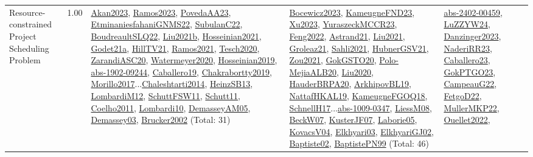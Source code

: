 {\begin{longtable}{p{3cm}r>{\raggedright\arraybackslash}p{6cm}>{\raggedright\arraybackslash}p{6cm}>{\raggedright\arraybackslash}p{8cm}}
\index{Resource-constrained Project Scheduling Problem}\index{Classification!Resource-constrained Project Scheduling Problem}Resource-constrained Project Scheduling Problem &  1.00 & \hyperref[detail:Akan2023]{Akan2023}, \hyperref[detail:Ramos2023]{Ramos2023}, \hyperref[detail:PovedaAA23]{PovedaAA23}, \hyperref[detail:EtminaniesfahaniGNMS22]{EtminaniesfahaniGNMS22}, \hyperref[detail:SubulanC22]{SubulanC22}, \hyperref[detail:BoudreaultSLQ22]{BoudreaultSLQ22}, \hyperref[detail:Liu2021b]{Liu2021b}, \hyperref[detail:Hosseinian2021]{Hosseinian2021}, \hyperref[detail:Godet21a]{Godet21a}, \hyperref[detail:HillTV21]{HillTV21}, \hyperref[detail:Ramos2021]{Ramos2021}, \hyperref[detail:Tesch2020]{Tesch2020}, \hyperref[detail:ZarandiASC20]{ZarandiASC20}, \hyperref[detail:Watermeyer2020]{Watermeyer2020}, \hyperref[detail:Hosseinian2019]{Hosseinian2019}, \hyperref[detail:abs-1902-09244]{abs-1902-09244}, \hyperref[detail:Caballero19]{Caballero19}, \hyperref[detail:Chakrabortty2019]{Chakrabortty2019}, \hyperref[detail:Morillo2017]{Morillo2017}...\hyperref[detail:Chaleshtarti2014]{Chaleshtarti2014}, \hyperref[detail:HeinzSB13]{HeinzSB13}, \hyperref[detail:LombardiM12]{LombardiM12}, \hyperref[detail:SchuttFSW11]{SchuttFSW11}, \hyperref[detail:Schutt11]{Schutt11}, \hyperref[detail:Coelho2011]{Coelho2011}, \hyperref[detail:Lombardi10]{Lombardi10}, \hyperref[detail:DemasseyAM05]{DemasseyAM05}, \hyperref[detail:Demassey03]{Demassey03}, \hyperref[detail:Brucker2002]{Brucker2002} (Total: 31) & \hyperref[detail:Bocewicz2023]{Bocewicz2023}, \hyperref[detail:KameugneFND23]{KameugneFND23}, \hyperref[detail:Xu2023]{Xu2023}, \hyperref[detail:YuraszeckMCCR23]{YuraszeckMCCR23}, \hyperref[detail:Feng2022]{Feng2022}, \hyperref[detail:Astrand21]{Astrand21}, \hyperref[detail:Liu2021]{Liu2021}, \hyperref[detail:Groleaz21]{Groleaz21}, \hyperref[detail:Sahli2021]{Sahli2021}, \hyperref[detail:HubnerGSV21]{HubnerGSV21}, \hyperref[detail:Zou2021]{Zou2021}, \hyperref[detail:GokGSTO20]{GokGSTO20}, \hyperref[detail:Polo-MejiaALB20]{Polo-MejiaALB20}, \hyperref[detail:Liu2020]{Liu2020}, \hyperref[detail:HauderBRPA20]{HauderBRPA20}, \hyperref[detail:ArkhipovBL19]{ArkhipovBL19}, \hyperref[detail:NattafHKAL19]{NattafHKAL19}, \hyperref[detail:KameugneFGOQ18]{KameugneFGOQ18}, \hyperref[detail:SchnellH17]{SchnellH17}...\hyperref[detail:abs-1009-0347]{abs-1009-0347}, \hyperref[detail:LiessM08]{LiessM08}, \hyperref[detail:BeckW07]{BeckW07}, \hyperref[detail:KusterJF07]{KusterJF07}, \hyperref[detail:Laborie05]{Laborie05}, \hyperref[detail:KovacsV04]{KovacsV04}, \hyperref[detail:Elkhyari03]{Elkhyari03}, \hyperref[detail:ElkhyariGJ02]{ElkhyariGJ02}, \hyperref[detail:Baptiste02]{Baptiste02}, \hyperref[detail:BaptistePN99]{BaptistePN99} (Total: 46) & \hyperref[detail:abs-2402-00459]{abs-2402-00459}, \hyperref[detail:LuZZYW24]{LuZZYW24}, \hyperref[detail:Danzinger2023]{Danzinger2023}, \hyperref[detail:NaderiRR23]{NaderiRR23}, \hyperref[detail:Caballero23]{Caballero23}, \hyperref[detail:GokPTGO23]{GokPTGO23}, \hyperref[detail:CampeauG22]{CampeauG22}, \hyperref[detail:FetgoD22]{FetgoD22}, \hyperref[detail:MullerMKP22]{MullerMKP22}, \hyperref[detail:Ouellet2022]{Ouellet2022}, 
\end{longtable}}
